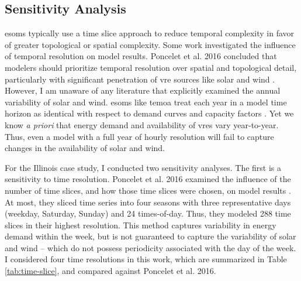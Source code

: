 


\subsection{Sensitivity Analysis}

\glspl{esom} typically use a time slice approach to reduce temporal complexity
in favor of greater topological or spatial complexity. Some work investigated the
influence of temporal resolution on model results. Poncelet et al. 2016
concluded that modelers should prioritize temporal resolution over spatial and
topological detail, particularly with significant penetration of \gls{vre}
sources like solar and wind \cite{poncelet_impact_2016}. However,
I am unaware of any literature that explicitly examined the annual variability
of solar and wind. \glspl{esom} like \gls{temoa} treat each year in a model
time horizon as identical with respect to demand curves and capacity factors
\cite{hunter_modeling_2013}. Yet
we know \textit{a priori} that energy demand and availability of \glspl{vre}
vary year-to-year. Thus, even a model with a full year of hourly resolution
will fail to capture changes in the availability of solar and wind.

For the Illinois case study, I conducted two sensitivity analyses. The first is a
sensitivity to time resolution. Poncelet et al. 2016 examined the influence of
the number of time slices, and how those time slices were chosen, on model results
\cite{poncelet_impact_2016}.
At most, they sliced time series into four seasons with three representative days (weekday,
Saturday, Sunday) and 24 times-of-day. Thus, they modeled 288 time slices in their
highest resolution. This
method captures variability in energy demand within the week, but is not guaranteed
to capture the variability of solar and wind -- which do not possess periodicity
associated with the day of the week. I considered four time resolutions in this work,
which are summarized in Table \ref{tab:time-slice}, and compared against Poncelet
et al. 2016.

